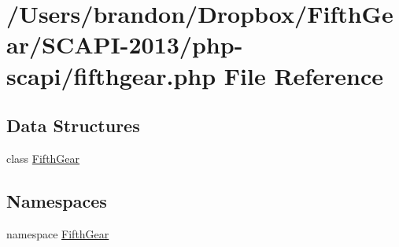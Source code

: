 \hypertarget{fifthgear_8php}{\section{/\-Users/brandon/\-Dropbox/\-Fifth\-Gear/\-S\-C\-A\-P\-I-\/2013/php-\/scapi/fifthgear.php File Reference}
\label{fifthgear_8php}
}
\subsection*{Data Structures}
\begin{DoxyCompactItemize}
\item 
class \hyperlink{class_fifth_gear}{Fifth\-Gear}
\end{DoxyCompactItemize}
\subsection*{Namespaces}
\begin{DoxyCompactItemize}
\item 
namespace \hyperlink{namespace_fifth_gear}{Fifth\-Gear}
\end{DoxyCompactItemize}
